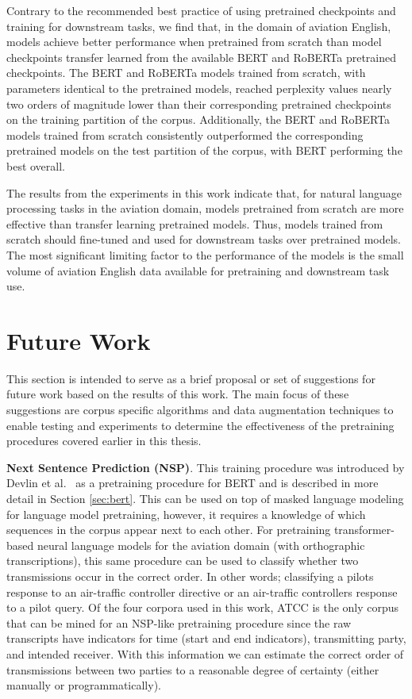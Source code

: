 \documentclass[12pt]{article}
\begin{document}
Contrary to the recommended best practice of using pretrained checkpoints and training for downstream tasks, we find that, in the domain of aviation
English, models achieve better performance when pretrained from scratch than model checkpoints transfer learned from the available BERT and RoBERTa
pretrained checkpoints. The BERT and RoBERTa models trained from scratch, with parameters identical to the pretrained models, reached perplexity
values nearly two orders of magnitude lower than their corresponding pretrained checkpoints on the training partition of the corpus. Additionally,
the BERT and RoBERTa models trained from scratch consistently outperformed the corresponding pretrained models on the test partition of the corpus,
with BERT performing the best overall.

The results from the experiments in this work indicate that, for natural language processing tasks in the aviation domain, models pretrained from
scratch are more effective than transfer learning pretrained models. Thus, models trained from scratch should fine-tuned and used for downstream tasks
over pretrained models. The most significant limiting factor to the performance of the models is the small volume of aviation English data available
for pretraining and downstream task use.

\section{Future Work}\label{sec:future_work}
This section is intended to serve as a brief proposal or set of suggestions for future work based on the results of this work. The main focus of these
suggestions are corpus specific algorithms and data augmentation techniques to enable testing and experiments to determine the effectiveness of the
pretraining procedures covered earlier in this thesis.

\textbf{Next Sentence Prediction (NSP)}. This training procedure was introduced by Devlin et al.~\cite{devlin_bert_2019} as a pretraining procedure
for BERT and is described in more detail in Section \ref{sec:bert}. This can be used on top of masked language modeling for language model
pretraining, however, it requires a knowledge of which sequences in the corpus appear next to each other. For pretraining transformer-based neural
language models for the aviation domain (with orthographic transcriptions), this same procedure can be used to classify whether two transmissions
occur in the correct order. In other words; classifying a pilots response to an air-traffic controller directive or an air-traffic controllers
response to a pilot query. Of the four corpora used in this work, ATCC is the only corpus that can be mined for an NSP-like pretraining procedure
since the raw transcripts have indicators for time (start and end indicators), transmitting party, and intended receiver. With this information we can
estimate the correct order of transmissions between two parties to a reasonable degree of certainty (either manually or programmatically).
\end{document}
